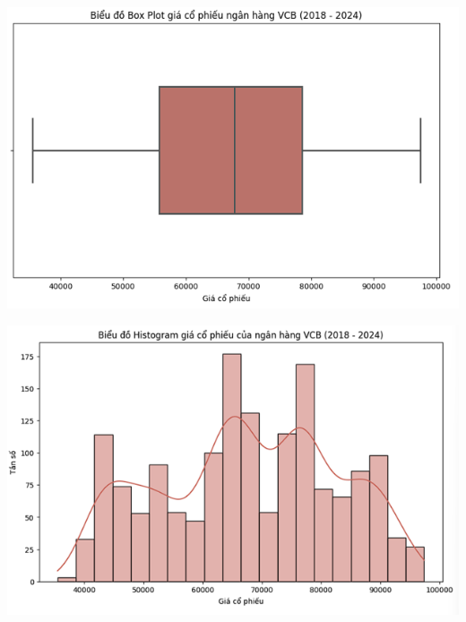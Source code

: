 \documentclass[conference]{IEEEtran}
\begin{document}
\begin{minipage}{0.23\textwidth}
    \centering
    \includegraphics[width=\linewidth]{images/Statistic/vcb_boxplot.png}
    \label{fig:image1}
\end{minipage}
\hfill
\begin{minipage}{0.23\textwidth}
    \centering
    \includegraphics[width=\linewidth]{images/Statistic/vcb_histogram.png}
    \label{fig:image2}
\end{minipage}
\end{document}
